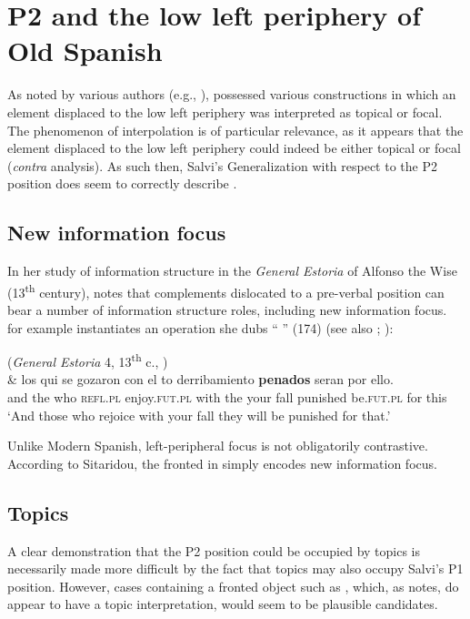 \documentclass[output=paper]{LSP/langsci}
\begin{document}
\section{P2 and the low left periphery of Old Spanish}\label{sec:poole:2}

As noted by various authors (e.g., \citealt{Sitaridou2011,Poole2013}),  possessed various constructions in which an element displaced to the low left periphery was interpreted as topical or focal.  The phenomenon of interpolation is of particular relevance, as it appears that the element displaced to the low left periphery could indeed be either topical or focal (\textit{contra}  analysis).  As such then, Salvi’s Generalization with respect to the P2 position does seem to correctly describe .

\subsection{New information focus}\label{sec:poole:2.2}
In her study of information structure in the \textit{General Estoria} of Alfonso the Wise (13\textsuperscript{th} century), \citet{Sitaridou2011} notes that complements dislocated to a pre-verbal position can bear a number of information structure roles, including new information focus.   for example instantiates an operation she dubs “ ” (174) (see also \citealt{Cruschina2008}; \citealt{CruschinaSitaridou2009}):

\ea%
    \label{ex:poole:2}
    (\textit{General Estoria} 4, 13\textsuperscript{th} c., \citealt[(25)]{Sitaridou2011})\\
    \gll  \& los qui se  gozaron con el to derribamiento \textbf{penados} seran por ello.  \\
	  and the who \textsc{refl.pl} enjoy.\textsc{fut}.\textsc{pl} with the your fall punished be.\textsc{fut}.\textsc{pl} for this\\
    \glt  ‘And those who rejoice with your fall they will be punished for that.’
    \z

\noindent Unlike Modern Spanish, left-peripheral focus is not obligatorily contrastive.  According to Sitaridou, the fronted  in  simply encodes new information focus.  

\subsection{Topics}\label{sec:poole:2.3}
A clear demonstration that the P2 position could be occupied by topics is necessarily made more difficult by the fact that topics may also occupy Salvi’s P1 position.  However, cases containing a fronted object such as , which, as \citet[170]{Sitaridou2011} notes, do appear to have a topic interpretation, would seem to be plausible candidates.
\end{document}
